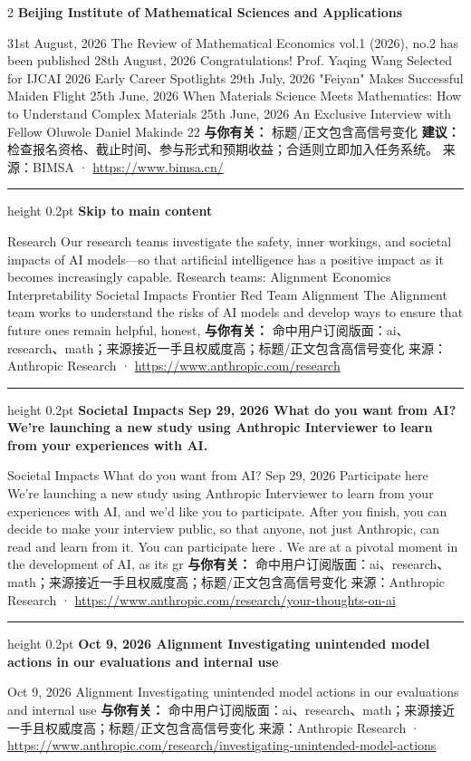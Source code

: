 \documentclass[10.5pt]{ctexart}
\begin{document}
\begin{multicols}{2}
{\large\bfseries Beijing Institute of Mathematical Sciences and Applications}\par
31st August, 2026 The Review of Mathematical Economics vol.1 (2026), no.2 has been published 28th August, 2026 Congratulations! Prof. Yaqing Wang Selected for IJCAI 2026 Early Career Spotlights 29th July, 2026 "Feiyan" Makes Successful Maiden Flight 25th June, 2026 When Materials Science Meets Mathematics: How to Understand Complex Materials 25th June, 2026 An Exclusive Interview with Fellow Oluwole Daniel Makinde 22
\textbf{与你有关：} 标题/正文包含高信号变化
\textbf{建议：} 检查报名资格、截止时间、参与形式和预期收益；合适则立即加入任务系统。
{\footnotesize\color{ormuted} 来源：BIMSA · \url{https://www.bimsa.cn/}}
\vspace{2mm}
\hrule height 0.2pt
\vspace{2mm}
{\large\bfseries Skip to main content}\par
Research Our research teams investigate the safety, inner workings, and societal impacts of AI models—so that artificial intelligence has a positive impact as it becomes increasingly capable. Research teams: Alignment Economics Interpretability Societal Impacts Frontier Red Team Alignment The Alignment team works to understand the risks of AI models and develop ways to ensure that future ones remain helpful, honest, 
\textbf{与你有关：} 命中用户订阅版面：ai、research、math；来源接近一手且权威度高；标题/正文包含高信号变化
{\footnotesize\color{ormuted} 来源：Anthropic Research · \url{https://www.anthropic.com/research}}
\vspace{2mm}
\hrule height 0.2pt
\vspace{2mm}
{\large\bfseries Societal Impacts Sep 29, 2026 What do you want from AI? We’re launching a new study using Anthropic Interviewer to learn from your experiences with AI.}\par
Societal Impacts What do you want from AI? Sep 29, 2026 Participate here We’re launching a new study using Anthropic Interviewer to learn from your experiences with AI, and we’d like you to participate. After you finish, you can decide to make your interview public, so that anyone, not just Anthropic, can read and learn from it. You can participate here . We are at a pivotal moment in the development of AI, as its gr
\textbf{与你有关：} 命中用户订阅版面：ai、research、math；来源接近一手且权威度高；标题/正文包含高信号变化
{\footnotesize\color{ormuted} 来源：Anthropic Research · \url{https://www.anthropic.com/research/your-thoughts-on-ai}}
\vspace{2mm}
\hrule height 0.2pt
\vspace{2mm}
{\large\bfseries Oct 9, 2026 Alignment Investigating unintended model actions in our evaluations and internal use}\par
Oct 9, 2026 Alignment Investigating unintended model actions in our evaluations and internal use
\textbf{与你有关：} 命中用户订阅版面：ai、research、math；来源接近一手且权威度高；标题/正文包含高信号变化
{\footnotesize\color{ormuted} 来源：Anthropic Research · \url{https://www.anthropic.com/research/investigating-unintended-model-actions}}
\end{multicols}
\end{document}
